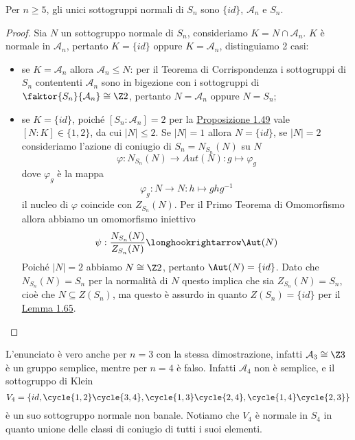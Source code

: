\documentclass[11pt]{scrartcl}
\begin{document}
\begin{proposition}
    Per $n\geq 5$, gli unici sottogruppi normali di $S_n$ sono $\{id\}$,
    $\mathcal{A}_n$ e $S_n$.
\end{proposition}

\begin{proof}
    Sia $N$ un sottogruppo normale di $S_n$, consideriamo $K= N \cap \mathcal{A}_n$.
    $K$ è normale in $\mathcal{A}_n$, pertanto $K = \{id\}$ oppure $K = \mathcal{A}_n$,
    distinguiamo 2 casi:
    \begin{itemize}
        \item se $K = \mathcal{A}_n$ allora $\mathcal{A}_n \leqslant N$: per il
        Teorema di Corrispondenza i sottogruppi di $S_n$ contententi $\mathcal{A}_n$
        sono in bigezione con i sottogruppi di $\faktor{S_n}{\mathcal{A}_n}\cong \Z2$,
        pertanto $N = \mathcal{A}_n$ oppure $N = S_n$;
        \item se $K = \{id\}$, poiché $[S_n:\mathcal{A}_n] = 2$ per la 
        \hyperref[prop1.49]{Proposizione 1.49} vale $[N:K] \in \{1, 2\}$, 
        da cui $|N| \leq 2$. Se $|N| = 1$ allora $N = \{id\}$, se $|N| = 2$
        consideriamo l'azione di coniugio di $S_n = N_{S_n}(N)$ su $N$
        \[
            \varphi: N_{S_n}(N)\longrightarrow Aut(N): g \longmapsto \varphi_g
        \]
        dove $\varphi_g$ è la mappa
        \[
            \varphi_g:N \longrightarrow N :h \longmapsto ghg^{-1}
        \]
        il nucleo di $\varphi$ coincide con $Z_{S_n}(N)$. Per il Primo Teorema
        di Omomorfismo allora abbiamo un omomorfismo iniettivo
        \[
            \psi :\frac{N_{S_n}(N)}{Z_{S_n}(N)}\longhookrightarrow \Aut(N)
        \]
        Poiché $|N| = 2$ abbiamo $N \cong \Z2$, pertanto $\Aut(N) = \{id\}$. 
        Dato che $N_{S_n}(N) = S_n$ per la normalità di $N$ questo implica che
        sia $Z_{S_n}(N) = S_n$, cioè che $N \subseteq Z(S_n)$, ma questo è assurdo
        in quanto $Z(S_n) = \{id\}$ per il \hyperref[lemma1.65]{Lemma 1.65}.
    \end{itemize}
\end{proof}

\begin{remark}
    L'enunciato è vero anche per $n = 3$ con la stessa dimostrazione, infatti
    $\mathcal{A}_3 \cong \Z3$ è un gruppo semplice, mentre per $n = 4$ è falso.
    Infatti $\mathcal{A}_4$ non è semplice, e il sottogruppo di Klein
    \[
        V_4 = \{id, \cycle{1, 2}\cycle{3, 4}, \cycle{1, 3}\cycle{2, 4}, \cycle{1, 4}\cycle{2, 3}\}
    \]
    è un suo sottogruppo normale non banale. Notiamo che $V_4$ è normale in 
    $S_4$ in quanto unione delle classi di coniugio di tutti i suoi elementi.
\end{remark}
\end{document}
